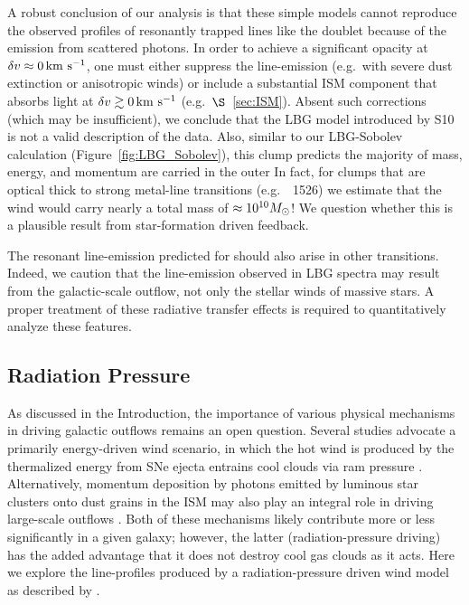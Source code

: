 \documentclass[12pt,preprint]{aastex}
\begin{document}
A robust conclusion of our
analysis is that these simple models cannot reproduce the
observed profiles of resonantly trapped lines like the 
doublet because of the emission from scattered photons.  In order to
achieve a significant opacity at $\delta v \approx 0 \, {\rm km~s^{-1}}$, one must
either suppress the line-emission (e.g.\ with severe dust extinction
or anisotropic winds) 
or include a substantial ISM component that absorbs light at $\delta v
\gtrsim 0 \, {\rm km~s^{-1}}$ (e.g.\ $\S$~\ref{sec:ISM}).  
Absent such corrections (which may be insufficient),
we conclude that the LBG model
introduced by S10 is not a valid description of the data.  Also,
similar to our LBG-Sobolev calculation (Figure~\ref{fig:LBG_Sobolev}),
this clump predicts the majority of mass, energy, and momentum are
carried in the outer 
In fact, for clumps that are optical thick to strong metal-line
transitions (e.g.\ ~1526) we estimate that the wind would
carry nearly a total mass of $\approx 10^{10} M_\odot$!  We question
whether this is a plausible result from star-formation driven
feedback.


The resonant line-emission predicted for  should also arise
in other transitions.  Indeed, we caution that the 
line-emission observed in LBG spectra
\citep[e.g.][]{prs+02} may result from the galactic-scale outflow, not
only the stellar winds of massive stars.
A proper treatment of these radiative transfer effects is required to
quantitatively analyze these features.

\subsection{Radiation Pressure}
\label{sec:radiative}

As discussed in the Introduction, the importance of various physical mechanisms
in driving galactic outflows remains an open
question.  Several studies advocate a primarily energy-driven
wind scenario, in which the hot wind is produced by the thermalized
energy from SNe ejecta entrains cool clouds via ram pressure \citep[e.g.][]{cc85,ham90,sh09}.
Alternatively, momentum deposition by photons emitted by luminous star clusters onto
dust grains in the ISM may also play an integral role in driving
large-scale outflows \citep[e.g.][]{mqt05,mmt10}.  Both of these
mechanisms likely contribute more or less significantly in a given
galaxy; however, the latter (radiation-pressure driving) has the added
advantage that it does not destroy cool gas clouds as it acts.  Here
we explore the line-profiles produced by a radiation-pressure driven
wind model as described by \cite{mqt05}.
\end{document}
